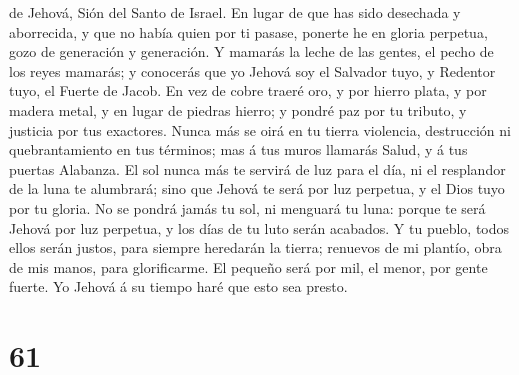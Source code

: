 de Jehová, Sión del Santo de Israel.  En lugar de que has
sido desechada y aborrecida, y que no había quien por ti pasase, ponerte
he en gloria perpetua, gozo de generación y generación.  Y
mamarás la leche de las gentes, el pecho de los reyes mamarás; y
conocerás que yo Jehová soy el Salvador tuyo, y Redentor tuyo, el Fuerte
de Jacob.  En vez de cobre traeré oro, y por hierro plata,
y por madera metal, y en lugar de piedras hierro; y pondré paz por tu
tributo, y justicia por tus exactores.  Nunca más se oirá
en tu tierra violencia, destrucción ni quebrantamiento en tus términos;
mas á tus muros llamarás Salud, y á tus puertas Alabanza. 
El sol nunca más te servirá de luz para el día, ni el resplandor de la
luna te alumbrará; sino que Jehová te será por luz perpetua, y el Dios
tuyo por tu gloria.  No se pondrá jamás tu sol, ni menguará
tu luna: porque te será Jehová por luz perpetua, y los días de tu luto
serán acabados.  Y tu pueblo, todos ellos serán justos,
para siempre heredarán la tierra; renuevos de mi plantío, obra de mis
manos, para glorificarme.  El pequeño será por mil, el
menor, por gente fuerte. Yo Jehová á su tiempo haré que esto sea presto.

\hypertarget{section-60}{%
\section{61}\label{section-60}}

